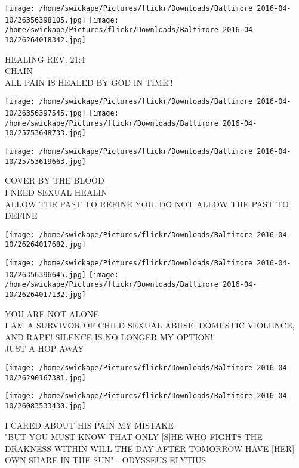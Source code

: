\documentclass[10pt,letterpaper]{article}
\begin{document}
\vspace{0.25in}
\texttt{[image: /home/swickape/Pictures/flickr/Downloads/Baltimore 2016-04-10/26356398105.jpg]}
\texttt{[image: /home/swickape/Pictures/flickr/Downloads/Baltimore 2016-04-10/26264018342.jpg]}

HEALING REV. 21:4\\
CHAIN\\
ALL PAIN IS HEALED BY GOD IN TIME!!\\
\pagebreak

\texttt{[image: /home/swickape/Pictures/flickr/Downloads/Baltimore 2016-04-10/26356397545.jpg]}
\texttt{[image: /home/swickape/Pictures/flickr/Downloads/Baltimore 2016-04-10/25753648733.jpg]}

\vspace{0.25in}
\texttt{[image: /home/swickape/Pictures/flickr/Downloads/Baltimore 2016-04-10/25753619663.jpg]}

COVER BY THE BLOOD\\
I NEED SEXUAL HEALIN\\
ALLOW THE PAST TO REFINE YOU.  DO NOT ALLOW THE PAST TO DEFINE\\
\pagebreak

\texttt{[image: /home/swickape/Pictures/flickr/Downloads/Baltimore 2016-04-10/26264017682.jpg]}

\vspace{0.25in}
\texttt{[image: /home/swickape/Pictures/flickr/Downloads/Baltimore 2016-04-10/26356396645.jpg]}
\texttt{[image: /home/swickape/Pictures/flickr/Downloads/Baltimore 2016-04-10/26264017132.jpg]}

YOU ARE NOT ALONE\\
I AM A SURVIVOR OF CHILD SEXUAL ABUSE, DOMESTIC VIOLENCE, AND RAPE!  SILENCE IS NO LONGER MY OPTION!\\
JUST A HOP AWAY\\
\pagebreak

\texttt{[image: /home/swickape/Pictures/flickr/Downloads/Baltimore 2016-04-10/26290167381.jpg]}

\vspace{0.25in}
\texttt{[image: /home/swickape/Pictures/flickr/Downloads/Baltimore 2016-04-10/26083533430.jpg]}

I CARED ABOUT HIS PAIN MY MISTAKE\\
"BUT YOU MUST KNOW THAT ONLY {[}S{]}HE WHO FIGHTS THE DRAKNESS WITHIN WILL THE DAY AFTER TOMORROW HAVE {[}HER{]} OWN SHARE IN THE SUN" {-} ODYSSEUS ELYTIUS\\
\pagebreak
\end{document}
